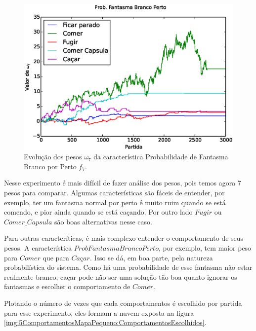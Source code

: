 \begin{figure}[H]
    \centering
    \includegraphics[width=\linewidth]{images/5_behaviors_small_map/weights____pol__ProbFantasmaBrancoPerto}
    \caption{Evolução dos pesos $ \omega_7 $ da característica Probabilidade de Fantasma Branco por Perto $ f_7 $.}
    \label{img:5ComportamentosMapaPequeno:PesoProbFantasmaBrancoPorPerto}
\end{figure}

Nesse experimento é mais difícil de fazer análise dos pesos, pois temos agora 7 pesos para comparar. Algumas características são fáceis de entender, por exemplo, ter um fantasma normal por perto é muito ruim quando se está comendo, e pior ainda quando se está caçando. Por outro lado $ Fugir $ ou $ Comer\_Capsula $ são boas alternativas nesse caso.

Para outras caracteríticas, é mais complexo entender o comportamento de seus pesos. A característica $ Prob Fantasma Branco Perto $, por exemplo, tem maior peso para $ Comer $ que para $ \textit{Caçar} $. Isso se dá, em boa parte, pela natureza probabilística do sistema. Como há uma probabilidade de esse fantasma não estar realmente branco, caçar pode não ser uma solução tão boa quanto ignorar os fantasmas e escolher o comportamento de $ Comer $.

Plotando o número de vezes que cada comportamentos é escolhido por partida para esse experimento, eles formam a nuvem exposta na figura \ref{img:5ComportamentosMapaPequeno:ComportamentosEscolhidos}.

